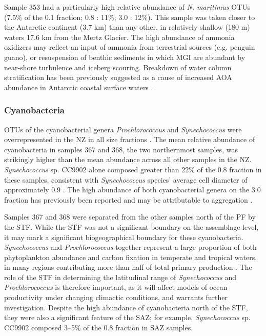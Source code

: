 Sample 353 had a particularly high relative abundance of \emph{N. maritimus} \acp{OTU} (7.5\% of the 0.1 \micron{} fraction; 0.8 \micron: 11\%; 3.0 \micron: 12\%).
This sample was taken closer to the Antarctic continent (3.7 km) than any other, in relatively shallow (180 m) waters 17.6 km from the Mertz Glacier.
The high abundance of ammonia oxidizers may reflect an input of ammonia from terrestrial sources (e.g.{} penguin guano), or resuspension of benthic sediments in which \ac{MGI} are abundant \cite{Bowman:2003fa} by near-shore turbulence and iceberg scouring.
Breakdown of water column stratification has been previously suggested as a cause of increased \ac{AOA} abundance in Antarctic coastal surface waters \cite{Kalanetra:2009bv}.

\subsubsection{Cyanobacteria}

\acp{OTU} of the cyanobacterial genera \emph{Prochlorococcus} and \emph{Synechococcus} were overrepresented in the \ac{NZ} in all size fractions .
The mean relative abundance of cyanobacteria in samples 367 and 368, the two northernmost samples, was strikingly higher than the mean abundance across all other samples in the \ac{NZ}.
\emph{Synechococcus} sp. CC9902 alone composed greater than 22\% of the 0.8 \micron{} fraction in these samples, consistent with \emph{Synechococcus} species' average cell diameter of approximately 0.9 \micron.
The high abundance of both cyanobacterial genera on the 3.0 \micron{} fraction has previously been reported \cite{Lauro:2010jna} and may be attributable to aggregation \cite{Lomas:2011bp}.

Samples 367 and 368 were separated from the other samples north of the \ac{PF} by the \ac{STF}.
While the \ac{STF} was not a significant boundary on the assemblage level, it may mark a significant biogeographical boundary for these cyanobacteria.
\emph{Synechococcus} and \emph{Prochlorococcus} together represent a large proportion of both phytoplankton abundance and carbon fixation in temperate and tropical waters, in many regions contributing more than half of total primary production \cite{Liu:1997ub,Liu:1998tk,Andre:1999uh}.
The role of the \ac{STF} in determining the latitudinal range of \emph{Synechococcus} and \emph{Prochlorococcus} is therefore important, as it will affect models of ocean productivity under changing climactic conditions, and warrants further investigation.
Despite the high abundance of cyanobacteria north of the \ac{STF}, they were also a significant feature of the \ac{SAZ}; for example, \emph{Synechococcus} sp. CC9902 composed 3--5\% of the 0.8 \micron{} fraction in \ac{SAZ} samples.

